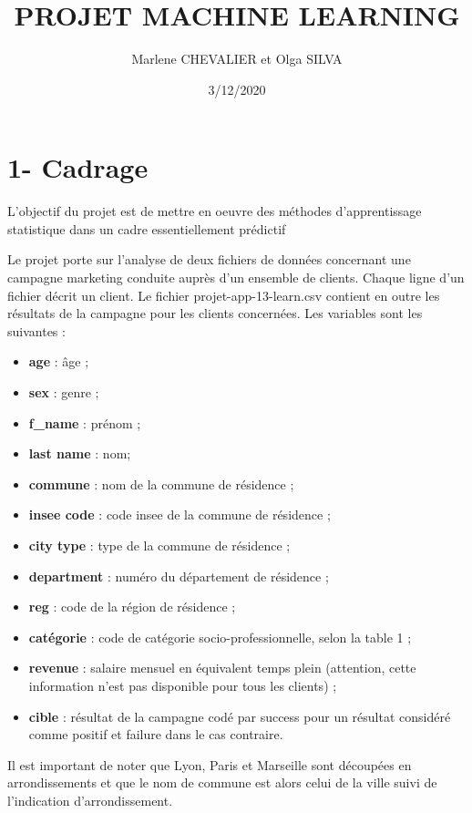 \documentclass[]{article}
\title{PROJET MACHINE LEARNING}
\author{Marlene CHEVALIER et Olga SILVA}
\date{3/12/2020}
\providecommand{\tightlist}{%
  \setlength{\itemsep}{0pt}\setlength{\parskip}{0pt}}
\begin{document}
\maketitle

\section{1- Cadrage}\label{cadrage}

L'objectif du projet est de mettre en oeuvre des méthodes
d'apprentissage statistique dans un cadre essentiellement prédictif

Le projet porte sur l'analyse de deux fichiers de données concernant une
campagne marketing conduite auprès d'un ensemble de clients. Chaque
ligne d'un fichier décrit un client. Le fichier projet-app-13-learn.csv
contient en outre les résultats de la campagne pour les clients
concernées. Les variables sont les suivantes :

\begin{itemize}
\tightlist
\item
  \textbf{age} : âge ;
\item
  \textbf{sex} : genre ;
\item
  \textbf{f\_name} : prénom ;
\item
  \textbf{last name} : nom;
\item
  \textbf{commune} : nom de la commune de résidence ;
\item
  \textbf{insee code} : code insee de la commune de résidence ;
\item
  \textbf{city type} : type de la commune de résidence ;
\item
  \textbf{department} : numéro du département de résidence ;
\item
  \textbf{reg} : code de la région de résidence ;
\item
  \textbf{catégorie} : code de catégorie socio-professionnelle, selon la
  table 1 ;
\item
  \textbf{revenue} : salaire mensuel en équivalent temps plein
  (attention, cette information n'est pas disponible pour tous les
  clients) ;
\item
  \textbf{cible} : résultat de la campagne codé par success pour un
  résultat considéré comme positif et failure dans le cas contraire.
\end{itemize}

Il est important de noter que Lyon, Paris et Marseille sont découpées en
arrondissements et que le nom de commune est alors celui de la ville
suivi de l'indication d'arrondissement.
\end{document}
